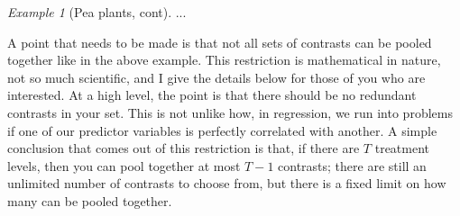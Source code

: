 \documentclass[a4paper, 12pt]{article}
\theoremstyle{plain}
\theoremstyle{definition}
\theoremstyle{remark}
\newtheorem*{example}{Example}
\begin{document}
\begin{example}[Pea plants, cont]
...
\end{example}

A point that needs to be made is that not all sets of contrasts can be pooled together like in the above example.  This restriction is mathematical in nature, not so much scientific, and I give the details below for those of you who are interested.  At a high level, the point is that there should be no redundant contrasts in your set.  This is not unlike how, in regression, we run into problems if one of our predictor variables is perfectly correlated with another.  A simple conclusion that comes out of this restriction is that, if there are $T$ treatment levels, then you can pool together at most $T-1$ contrasts; there are still an unlimited number of contrasts to choose from, but there is a fixed limit on how many can be pooled together.  
\end{document}
